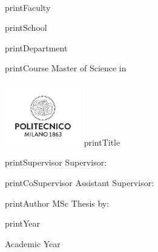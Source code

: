 \begin{titlepage}
\large \linespread{1.05}
\begin{center}
\textsc{\printUniversity}\\[1em]

\ifcsname printFaculty\endcsname
    \printFaculty\\
\fi

\ifcsname printSchool\endcsname
    \printSchool\\
\fi

\ifcsname printDepartment\endcsname
    \printDepartment\\[.5em]
\fi

\ifcsname printCourse\endcsname
Master of Science in\\
    \printCourse\\
\fi
\vfill
\includegraphics[width=0.25\textwidth]{util/logo_polimi_symbol.pdf}
\vfill
\ifcsname printTitle\endcsname
\Huge{\textsc{\color{TitleColor}{\printTitle}}}
\vfill
\fi
\end{center}

\ifcsname printSupervisor\endcsname
\noindent Supervisor:\\
    \textsc{\printSupervisor}
\fi

\ifcsname printCoSupervisor\endcsname
\vspace{6px} \noindent Assistant Supervisor:\\
    \textsc{\printCoSupervisor}
\fi

\ifcsname printAuthor\endcsname
\vfill
\flushright
MSc Thesis by:\\[0.1cm]
	\printAuthor
\fi

\ifcsname printYear\endcsname
\vfill
\begin{center}
Academic Year \printYear
\end{center}
\fi
\end{titlepage}
\restoregeometry